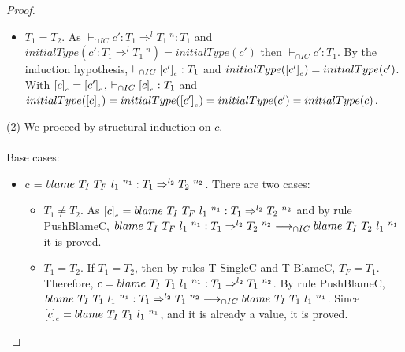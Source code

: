 \documentclass[a4paper]{article}
\begin{document}
\begin{proof}
\begin{itemize}
\begin{itemize}
        \item $T_1 = T_2$.
        As $\vdash_{\cap IC} c' : T_1 \Rightarrow^l T_1\ ^n : T_1$ and $initialType(c' : T_1 \Rightarrow^l T_1\ ^n) = initialType(c')$ then $\vdash_{\cap IC} c' : T_1$.
        By the induction hypothesis, $\vdash_{\cap IC} [c']_{_c} : T_1$ and $initialType([c']_{_c}) = initialType(c')$.
        With $[c]_{_c} = [c']_{_c}$, $\vdash_{\cap IC} [c]_{_c} : T_1$ and $initialType([c]_{_c}) = initialType([c']_{_c}) = initialType(c') = initialType(c)$.
    \end{itemize}
\end{itemize}
(2) We proceed by structural induction on $c$.\\\\
Base cases:
\begin{itemize}
    \item c = $blame\ T_I\ T_F\ l_1\ ^{n_1} : T_1 \Rightarrow^{l_2} T_2\ ^{n_2}$.
    There are two cases:
    \begin{itemize}
        \item $T_1 \neq T_2$.
        As $\erasec{c} = \blamecast{T_I}{T_F}{l_1}{n_1} : T_1 \Rightarrow^{l_2} T_2\ ^{n_2}$ and by rule PushBlameC, $blame\ T_I\ T_F\ l_1\ ^{n_1} : T_1 \Rightarrow^{l_2} T_2\ ^{n_2} \longrightarrow_{\cap IC} blame\ T_I\ T_2\ l_1\ ^{n_1}$ it is proved.
        \item $T_1 = T_2$.
        If $T_1 = T_2$, then by rules T-SingleC and T-BlameC, $T_F = T_1$.
        Therefore, $c = blame\ T_I\ T_1\ l_1\ ^{n_1} : T_1 \Rightarrow^{l_2} T_1\ ^{n_2}$.
        By rule PushBlameC, $blame\ T_I\ T_1\ l_1\ ^{n_1} : T_1 \Rightarrow^{l_2} T_1\ ^{n_2} \longrightarrow_{\cap IC} blame\ T_I\ T_1\ l_1\ ^{n_1}$.
        Since $[c]_{_c} = blame\ T_I\ T_1\ l_1\ ^{n_1}$, and it is already a value, it is proved.
    \end{itemize}
    \begin{comment}
    \item c = $\stuckcast{T_I}{T_F}{n_1} : T_1 \Rightarrow^l T_2\ ^{n_2}$.
    There are two cases:
    \begin{itemize}
        \item $T_1 \neq T_2$.
        As $\erasec{c} = \stuckcast{T_I}{T_F}{n_1} : T_1 \Rightarrow^l T_2\ ^{n_2}$ and by rule PushStuckC, $\stuckcast{T_I}{T_F}{n_1} : T_1 \Rightarrow^l T_2\ ^{n_2} \longrightarrow_{\cap IC} \stuckcast{T_I}{T_2}{n_1}$ it is proved.
        \item $T_1 = T_2$.
        If $T_1 = T_2$, then by rules T-SingleC and T-StuckC, $T_F = T_1$.

\end{comment}
\end{itemize}
\end{proof}
\end{document}
